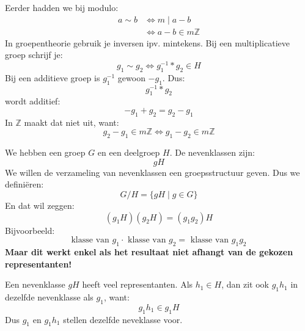 Eerder hadden we bij modulo:
\begin{equation*}
    \begin{aligned}
        a \sim b &\iff m \mid a - b\\
                 &\iff a - b \in m\mathbb{Z}
    \end{aligned}
\end{equation*}
In groepentheorie gebruik je inversen ipv. mintekens. Bij een multiplicatieve groep schrijf je:
\begin{equation*}
    g_1 \sim g_2 \iff g_1^{-1} * g_2 \in H
\end{equation*}
Bij een additieve groep is $g_1^{-1}$ gewoon $-g_1$.
Dus:
\begin{equation*}
    g_1^{-1} * g_2
\end{equation*}
wordt additief:
\begin{equation*}
    -g_1 + g_2 = g_2 - g_1
\end{equation*}
In $\mathbb{Z}$ maakt dat niet uit, want:
\begin{equation*}
    g_2 - g_1 \in m\mathbb{Z} \iff g_1 - g_2 \in m\mathbb{Z}
\end{equation*}


We hebben een groep $G$ en een deelgroep $H$. De nevenklassen zijn:
\begin{equation*}
    gH
\end{equation*}
We willen de verzameling van nevenklassen een groepsstructuur geven. Dus we definiëren:
\begin{equation*}
    G/H = \{gH \mid g \in G\}
\end{equation*}
En dat wil zeggen:
\begin{equation*}
    (g_1H)(g_2H) = (g_1g_2)H
\end{equation*}
Bijvoorbeeld:
\begin{equation*}
    \text{klasse van }g_1 \cdot \text{ klasse van }g_2 = \text{ klasse van }g_1g_2
\end{equation*}
\textbf{Maar dit werkt enkel als het resultaat niet afhangt van de gekozen representanten!}


Een nevenklasse $gH$ heeft veel representanten. Als $h_1 \in H$, dan zit ook $g_1h_1$ in dezelfde nevenklasse als $g_1$, want:
\begin{equation*}
    g_1h_1 \in g_1H
\end{equation*}
Dus $g_1$ en $g_1h_1$ stellen dezelfde neveklasse voor.

